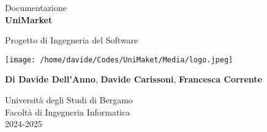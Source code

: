 \documentclass[a4paper,12pt]{article}
\begin{document}
\begin{titlepage}
    \centering
    \vspace*{2cm}
    
    \vspace{1.5cm}
    
    \large Documentazione\\
    \Huge
    \textbf{UniMarket}
    
    \vspace{1.5cm}
    
    \LARGE
    Progetto di Ingegneria del Software
    
    \vspace{1.5cm}
    \texttt{[image: /home/davide/Codes/UniMaket/Media/logo.jpeg]}
    
    \vspace{1.5cm}
    \small
    \textbf{Di Davide Dell'Anno}, \textbf{Davide Carissoni}, \textbf{Francesca Corrente}
    
    \vspace{1.5cm}
    
    \Large
    Università degli Studi di Bergamo \\
    Facoltà di Ingegneria Informatica \\
    2024-2025
    
\end{titlepage}
\end{document}
